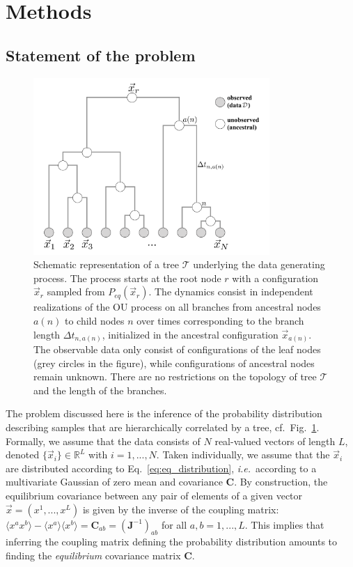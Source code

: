 \documentclass[preprint,amsmath,amssymb,superscriptaddress,showpacs,pre]{revtex4-1}
\newcommand{\ie}{\emph{i.e.}}
\def\vx{\vec x}
\begin{document}
\section{Methods}
\label{sec:methods}

\subsection{Statement of the problem}
\label{sub:statement_of_the_problem}


\begin{figure}[!htb]
	\includegraphics[width=0.8\textwidth]{Figures/tree.pdf}
	\caption{Schematic representation of a tree $\mathcal{T}$ underlying the data generating process. The process starts at the root node $r$ with a configuration $\vx_r$ sampled from $P_{eq}(\vx_r)$. The dynamics consist in independent realizations of the OU process on all branches from ancestral nodes $a(n)$ to child nodes $n$ over times corresponding to the branch length $\Delta t_{n,a(n)}$, initialized in the ancestral configuration $\vx_{a(n)}$. The observable data only consist of configurations of the leaf nodes (grey circles in the figure), while configurations of ancestral nodes remain unknown. There are no restrictions on the topology of tree $\mathcal{T}$ and the length of the branches.}
	\label{fig:sample_tree}
\end{figure}


The problem discussed here is the inference of the probability distribution describing samples that are hierarchically correlated by a tree, cf.~Fig.~\ref{fig:sample_tree}. 
Formally, we assume that the data consists of $N$ real-valued vectors of length $L$, denoted $\{\vx_i\}\in\mathbb{R}^L$ with $i=1,...,N$. 
Taken individually, we assume that the $\vx_i$ are distributed according to Eq.~\eqref{eq:eq_distribution}, \ie~according to a multivariate Gaussian of zero mean and covariance $\bm C$.
By construction, the equilibrium covariance between any pair of elements of a given vector $\vx=(x^1,...,x^L)$ is given by the inverse of the coupling matrix: $\langle x^a x^b\rangle-\langle x^a\rangle\langle x^b\rangle = \bm C_{ab} = (\bm J^{-1})_{ab}$ for all $a,b=1,...,L$. 
This implies that inferring the coupling matrix defining the probability distribution amounts to finding the \emph{equilibrium} covariance matrix $\mathbf{C}$.  
\end{document}
